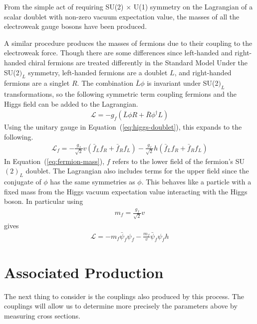 From the simple act of requiring SU(2) $\times$ U(1) symmetry on the Lagrangian of a scalar
doublet with non-zero vacuum expectation value,
the masses of all the electroweak gauge bosons have been produced.

A similar procedure produces the masses of fermions due to their
coupling to the electroweak force.
Though there are some differences since left-handed and right-handed chiral fermions
are treated differently in the Standard Model
Under the SU(2$)_L$ symmetry, left-handed fermions are a doublet $L$,
and right-handed fermions are a singlet $R$.
The combination $\bar{L}\phi$ is invariant under SU(2$)_L$ transformations,
so the following symmetric term coupling fermions and the Higgs field can be added to the Lagrangian.
\begin{gather}
  \mathcal{L} = -g_f(\bar{L}\phi R + \bar{R}\phi^\dagger L)
\end{gather}
Using the unitary gauge in Equation~(\ref{eq:higgs-doublet}), this expands to the following.
\begin{gather}
  \mathcal{L}_f =
  -\frac{g_f}{\sqrt2} v \left(\bar{f}_L f_R + \bar{f}_R f_L \right)
  -\frac{g_f}{\sqrt2} h \left(\bar{f}_L f_R + \bar{f}_R f_L \right)
  \label{eq:fermion-mass}
\end{gather}
In Equation~(\ref{eq:fermion-mass}),
$f$ refers to the lower field of the fermion's SU$(2)_L$ doublet.
The Lagrangian also includes terms for the upper field since the conjugate of $\phi$
has the same symmetries as $\phi$.
This behaves like a particle with a fixed mass from the Higgs vacuum expectation value
interacting with the Higgs boson.
In particular using
\begin{gather}
  m_f = \frac{g_f}{\sqrt{2}}v
\end{gather}
gives
\begin{gather}
  \mathcal{L} = -m_f\bar{\psi}_f\psi_f - \frac{m_f}{v}\bar{\psi}_f\psi_fh
\end{gather}

\section{Associated Production}

The next thing to consider is the couplings also produced by this process.
The couplings will allow us to determine more precisely the parameters above
by measuring cross sections.

